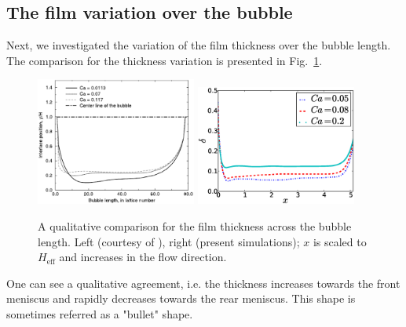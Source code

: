 \documentclass[preprint,12pt]{elsarticle}
\begin{document}
\subsection{The film variation over the bubble}
\label{section:film:thickness:variation}
Next, we investigated the variation of the film thickness over the bubble length.
The comparison for the thickness variation is presented in Fig.~\ref{fig:sehgal:bubble:length}.
\begin{figure}
\includegraphics[width=0.47\textwidth]{Figures/Bubble/bubble_sehgal.eps}\hfill
\includegraphics[width=0.47\textwidth]{Figures/Bubble/bubble_length.eps}\\
\caption{A qualitative comparison for the film thickness across
the bubble length. Left (courtesy of \citet{sehgal-microchannel}),
right (present simulations); $x$ is scaled to $H_{\mathrm{eff}}$
and increases in the flow direction.\label{fig:sehgal:bubble:length}}
\end{figure}
One can see a qualitative agreement, i.e. the thickness increases towards the front meniscus and
rapidly decreases towards the rear meniscus. This shape is sometimes referred as a "bullet"
shape.
\end{document}
